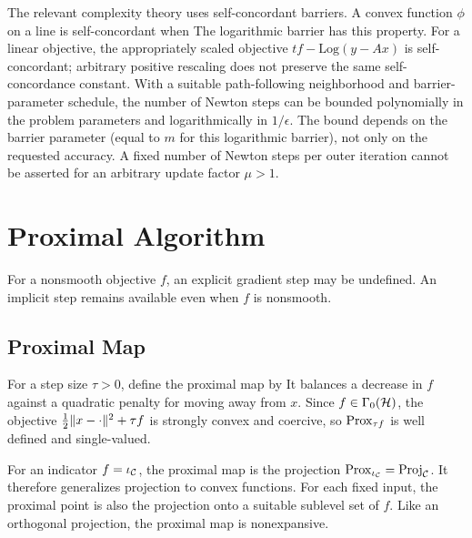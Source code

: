The relevant complexity theory uses self-concordant barriers. A convex function $\phi$ on a line is self-concordant when
The logarithmic barrier has this property. For a linear objective, the appropriately scaled objective $t f-\mathrm{Log}(y-Ax)$ is self-concordant; arbitrary positive rescaling does not preserve the same self-concordance constant. With a suitable path-following neighborhood and barrier-parameter schedule, the number of Newton steps can be bounded polynomially in the problem parameters and logarithmically in $1/\epsilon$. The bound depends on the barrier parameter (equal to $m$ for this logarithmic barrier), not only on the requested accuracy. A fixed number of Newton steps per outer iteration cannot be asserted for an arbitrary update factor $\mu>1$.

\section{Proximal Algorithm}

For a nonsmooth objective $f$, an explicit gradient step may be undefined. An implicit step remains available even when $f$ is nonsmooth.


\subsection{Proximal Map}

For a step size $\tau>0$, define the proximal map by
It balances a decrease in $f$ against a quadratic penalty for moving away from $x$.
%
Since $f\in\Gamma_0(\mathcal{H})$, the objective $\frac12\lVert x-\cdot\rVert^2+\tau f$ is strongly convex and coercive, so $\operatorname{Prox}_{\tau f}$ is well defined and single-valued.

For an indicator $f=\iota_{\mathcal{C}}$, the proximal map is the projection $\operatorname{Prox}_{\iota_{\mathcal{C}}}=\operatorname{Proj}_{\mathcal{C}}$. It therefore generalizes projection to convex functions. For each fixed input, the proximal point is also the projection onto a suitable sublevel set of $f$. Like an orthogonal projection, the proximal map is nonexpansive.

